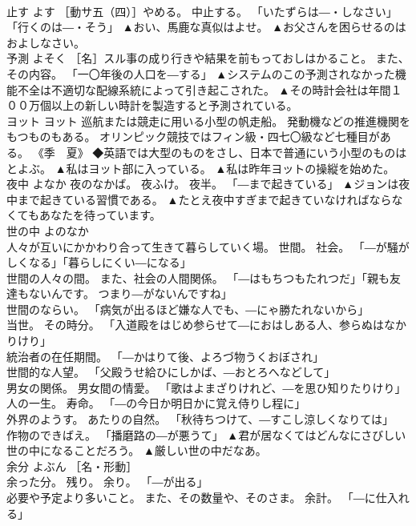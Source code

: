 \documentclass[8pt]{extreport}
\begin{document}
\begin{CJK}{UTF8}{min}
\\	止す	よす	［動サ五（四）］やめる。 中止する。 「いたずらは―・しなさい」「行くのは―・そう」	▲おい、馬鹿な真似はよせ。 ▲お父さんを困らせるのはおよしなさい。
\\	予測	よそく	［名］スル事の成り行きや結果を前もっておしはかること。 また、その内容。 「一〇年後の人口を―する」	▲システムのこの予測されなかった機能不全は不適切な配線系統によって引き起こされた。 ▲その時計会社は年間１００万個以上の新しい時計を製造すると予測されている。
\\	ヨット	ヨット	巡航または競走に用いる小型の帆走船。 発動機などの推進機関をもつものもある。 オリンピック競技ではフィン級・四七〇級など七種目がある。 《季　夏》 ◆英語では大型のものをさし、日本で普通にいう小型のものは
\\	とよぶ。	▲私はヨット部に入っている。 ▲私は昨年ヨットの操縦を始めた。
\\	夜中	よなか	夜のなかば。 夜ふけ。 夜半。 「―まで起きている」	▲ジョンは夜中まで起きている習慣である。 ▲たとえ夜中すぎまで起きていなければならなくてもあなたを待っています。
\\	世の中	よのなか	
\\	人々が互いにかかわり合って生きて暮らしていく場。 世間。 社会。 「―が騒がしくなる」「暮らしにくい―になる」 
\\	世間の人々の間。 また、社会の人間関係。 「―はもちつもたれつだ」「親も友達もないんです。 つまり―がないんですね」 
\\	世間のならい。 「病気が出るほど嫌な人でも、―にゃ勝たれないから」 
\\	当世。 その時分。 「入道殿をはじめ参らせて―におはしある人、参らぬはなかりけり」 
\\	統治者の在任期間。 「―かはりて後、よろづ物うくおぼされ」 
\\	世間的な人望。 「父殿うせ給ひにしかば、―おとろへなどして」 
\\	男女の関係。 男女間の情愛。 「歌はよまざりけれど、―を思ひ知りたりけり」 
\\	人の一生。 寿命。 「―の今日か明日かに覚え侍りし程に」 
\\	外界のようす。 あたりの自然。 「秋待ちつけて、―すこし涼しくなりては」 
\\	作物のできばえ。 「播磨路の―が悪うて」	▲君が居なくてはどんなにさびしい世の中になることだろう。 ▲厳しい世の中だなあ。
\\	余分	よぶん	［名・形動］ 
\\	余った分。 残り。 余り。 「―が出る」 
\\	必要や予定より多いこと。 また、その数量や、そのさま。 余計。 「―に仕入れる」 

\end{CJK}
\end{document}
